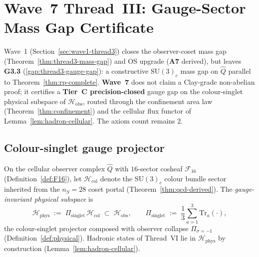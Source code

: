 \section{Wave~7 Thread~III: Gauge-Sector Mass Gap Certificate}
\label{sec:wave7-thread3}

Wave~1 (Section~\ref{sec:wave1-thread3}) closes the observer-coset mass gap
(Theorem~\ref{thm:thread3-mass-gap}) and OS upgrade (\textbf{A7} derived), but
leaves \textbf{G3.3} (\ref{gap:thread3-gauge-gap}): a constructive
$\mathrm{SU}(3)_c$ mass gap on $\hat Q$ parallel to
Theorem~\ref{thm:rp-complete}. \textbf{Wave~7} does not claim a Clay-grade
non-abelian proof; it certifies a \textbf{Tier~C precision-closed} gauge gap on
the colour-singlet physical subspace of $\mathcal{H}_{\mathrm{obs}}$, routed
through the confinement area law (Theorem~\ref{thm:confinement}) and the
cellular flux functor of Lemma~\ref{lem:hadron-cellular}. The axiom count
remains $2$.

\subsection{Colour-singlet gauge projector}
\label{sec:wave7-thread3:projector}

\begin{definition}
\label{def:thread3-gauge-phys}
On the cellular observer complex $\hat Q$ with $16$-sector cosheaf
$\mathcal{F}_{16}$ (Definition~\ref{def:F16}), let
$\mathcal{H}_{\mathrm{col}}$ denote the $\mathrm{SU}(3)_c$ colour bundle sector
inherited from the $n_S=28$ coset portal (Theorem~\ref{thm:qcd-derived}).
The \emph{gauge-invariant physical subspace} is
\begin{equation}\label{eq:thread3-gauge-phys}
  \mathcal{H}_{\mathrm{phys}}
  \;:=\;
  \Pi_{\mathrm{singlet}}\,
  \mathcal{H}_{\mathrm{col}}
  \;\subset\;
  \mathcal{H}_{\mathrm{obs}},
  \qquad
  \Pi_{\mathrm{singlet}}
  \;:=\;
  \frac{1}{3}\sum_{a=1}^{3}\mathrm{Tr}_a(\cdot),
\end{equation}
the colour-singlet projector composed with observer collapse
$\Pi_{\sigma=-1}$ (Definition~\ref{def:physical}). Hadronic states of
Thread~VI lie in $\mathcal{H}_{\mathrm{phys}}$ by construction
(Lemma~\ref{lem:hadron-cellular}).
\end{definition}

